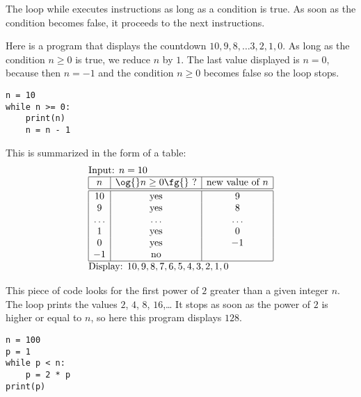 \documentclass[11pt,class=report,crop=false]{standalone}
\begin{document}
\begin{cours}
The loop \og{}while\fg{} executes instructions as long as a condition is true.
As soon as the condition becomes false, it proceeds to the next instructions.




\begin{exemple}
\begin{minipage}{0.55\textwidth}
Here is a program that displays the countdown $10,9,8,\ldots3,2,1,0$.
As long as the condition $n \ge 0$ is true, we reduce $n$ by $1$. The last value displayed is $n=0$, because then $n=-1$ and the condition \og{}$n \ge 0$\fg{} becomes false so the loop stops.
\end{minipage}\qquad\qquad
\begin{minipage}{0.4\textwidth}
\begin{lstlisting}
n = 10
while n >= 0:
    print(n)
    n = n - 1
\end{lstlisting}
\end{minipage}

\medskip

This is summarized in the form of a table:
  $$
  \begin{array}{l}
  \text{Input: $n=10$}    \\
  \begin{array}{|c|c|c|}
  \hline  
  n & \text{\og{}$n\ge0$\fg{} ?} & \text{new value of } n \\
  \hline\hline 
  10 & \text{yes} & 9 \\
  9 & \text{yes} & 8 \\
  \ldots & \ldots & \ldots \\
  1 & \text{yes} & 0 \\
  0 & \text{yes} & -1 \\
  -1 & \text{no} &  \\ 
  \hline
  \end{array} \\
  \text{Display: $10,9,8,7,6,5,4,3,2,1,0$}  
  \end{array} 
  $$ 

\end{exemple}


\begin{exemple}
\begin{minipage}{0.55\textwidth}
This piece of code looks for the first power of $2$ greater than a given integer $n$.
The loop prints the values $2$, $4$, $8$, $16$,\ldots{} It stops as soon as the power of $2$ is higher or equal to $n$, so here this program displays $128$.
\end{minipage}\qquad\qquad
\begin{minipage}{0.4\textwidth}
\begin{lstlisting}
n = 100
p = 1
while p < n:
    p = 2 * p
print(p)
\end{lstlisting}
\end{minipage}


\end{exemple}
\end{cours}
\end{document}
